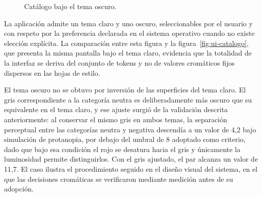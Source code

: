 \begin{figure}[ht]
	\centering
	\caption{Catálogo bajo el tema oscuro.}
	\label{fig:ui-tema-oscuro}
\end{figure}

La aplicación admite un tema claro y uno oscuro, seleccionables por el usuario y con respeto por la preferencia declarada en el sistema operativo cuando no existe elección explícita. La comparación entre esta figura y la figura~\ref{fig:ui-catalogo}, que presenta la misma pantalla bajo el tema claro, evidencia que la totalidad de la interfaz se deriva del conjunto de tokens y no de valores cromáticos fijos dispersos en las hojas de estilo.

El tema oscuro no se obtuvo por inversión de las superficies del tema claro. El gris correspondiente a la categoría neutra es deliberadamente más oscuro que su equivalente en el tema claro, y ese ajuste surgió de la validación descrita anteriormente: al conservar el mismo gris en ambos temas, la separación perceptual entre las categorías neutra y negativa descendía a un valor de 4,2 bajo simulación de protanopia, por debajo del umbral de 8 adoptado como criterio, dado que bajo esa condición el rojo se desatura hacia el gris y únicamente la luminosidad permite distinguirlos. Con el gris ajustado, el par alcanza un valor de 11,7. El caso ilustra el procedimiento seguido en el diseño visual del sistema, en el que las decisiones cromáticas se verificaron mediante medición antes de su adopción.
